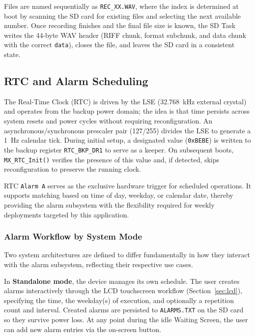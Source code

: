 Files are named sequentially as \texttt{REC\_XX.WAV}, where the index is determined at boot by scanning the SD card for existing files and selecting the next available number. Once recording finishes and the final file size is known, the SD Task writes the 44-byte WAV header (RIFF chunk, format subchunk, and data chunk with the correct \texttt{data}), closes the file, and leaves the SD card in a consistent state.

\subsection{RTC and Alarm Scheduling}
\label{sec:rtc}

The Real-Time Clock (RTC) is driven by the LSE (\SI{32.768}{\kHz} external crystal) and operates from the backup power domain; the idea is that time persists across system resets and power cycles without requiring reconfiguration. An asynchronous/synchronous prescaler pair (127/255) divides the LSE to generate a \SI{1}{\Hz} calendar tick. During initial setup, a designated value (\texttt{0xBEBE}) is written to the backup register \texttt{RTC\_BKP\_DR1} to serve as a keeper. On subsequent boots, \texttt{MX\_RTC\_Init()} verifies the presence of this value and, if detected, skips reconfiguration to preserve the running clock.

RTC \texttt{Alarm A} serves as the exclusive hardware trigger for scheduled operations. It supports matching based on time of day, weekday, or calendar date, thereby providing the alarm subsystem with the flexibility required for weekly deployments targeted by this application.

\subsubsection{Alarm Workflow by System Mode}

Two system architectures are defined to differ fundamentally in how they interact with the alarm subsystem, reflecting their respective use cases.

In \textbf{Standalone mode}, the device manages its own schedule. The user creates alarms interactively through the LCD touchscreen workflow (Section~\ref{sec:lcd}), specifying the time, the weekday(s) of execution, and optionally a repetition count and interval. Created alarms are persisted to \texttt{ALARMS.TXT} on the SD card so they survive power loss. At any point during the idle Waiting Screen, the user can add new alarm entries via the on-screen button.

